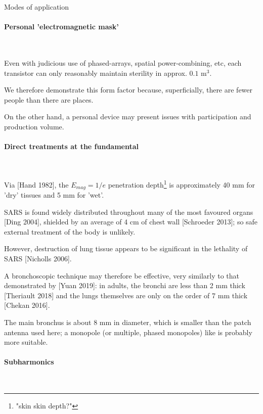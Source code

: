 \documentclass[fleqn,10pt]{article}
\begin{document}
\clearpage
\begin{multicols}{1}
{\Large Modes of application}\\

\paragraph{\textbf{Personal 'electromagnetic mask'}}\

Even with judicious use of phased-arrays, spatial power-combining, etc, each transistor can only reasonably maintain sterility in approx. $ 0.1 \text{ m}^3 $.

We therefore demonstrate this form factor because, superficially, there are fewer people than there are places. 

On the other hand, a personal device may present issues with participation and production volume. 

\paragraph{\textbf{Direct treatments at the fundamental}}\

Via [Hand 1982], the $E_{mag}=1/e$ penetration depth\footnote{"skin skin depth?"} is approximately 40 mm for 'dry' tissues and 5 mm for 'wet'. 



SARS is found widely distributed throughout many of the most favoured organs [Ding 2004], shielded by an average of 4 cm of chest wall [Schroeder 2013]; so safe external treatment of the body is unlikely.

However, destruction of lung tissue appears to be significant in the lethality of SARS [Nicholls 2006]. 

A bronchoscopic technique may therefore be effective, very similarly to that demonstrated by [Yuan 2019]: in adults, the bronchi are less than 2 mm thick [Theriault 2018] and the lungs themselves are only on the order of 7 mm thick [Chekan 2016]. 

The main bronchus is about 8 mm in diameter, which is smaller than the patch antenna used here; a monopole (or multiple, phased monopoles) like is probably more suitable.

\paragraph{\textbf{Subharmonics}}\


\end{multicols}
\end{document}
